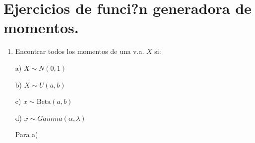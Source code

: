 \section{Ejercicios  de funci?n generadora de momentos.}
\begin{enumerate}
\item Encontrar todos los momentos de una v.a. $X$ si:

\smallskip

a) $X\sim N \left(0,1 \right)$ 

\smallskip

b) $X \sim U \left(a,b \right)$

\smallskip

c) $x \sim \textrm{Beta} \left(a,b \right)$

\smallskip

d) $x\sim Gamma \left( \alpha, \lambda \right)$

\smallskip

Para a)


\end{enumerate}
